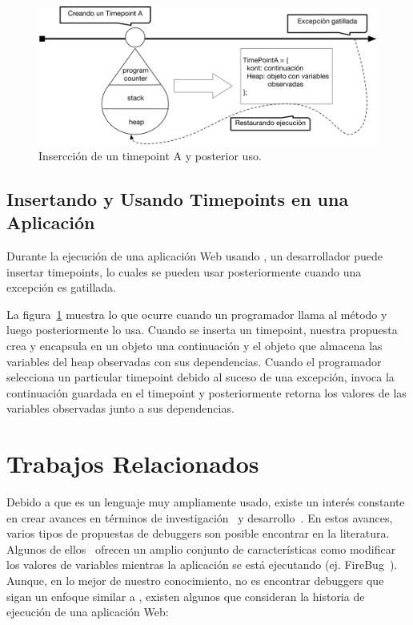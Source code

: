 \documentclass[conference]{IEEEtran}
\begin{document}
\begin{figure}[t]
\begin{center}
\includegraphics[width=.95\linewidth]{fig-timePointA}
\caption{Insercci\'on de un timepoint A y posterior uso.}
\label{fig:tpA}
\end{center}
\end{figure}


\subsection{Insertando y Usando Timepoints en una Aplicaci\'on}
\label{sec:utime}

Durante la ejecuci\'on de una aplicaci\'on Web usando \deloreanjs, un desarrollador puede insertar timepoints, lo cuales se pueden usar posteriormente cuando una excepci\'on es gatillada.  

 La figura~\ref{fig:tpA} muestra lo que ocurre cuando un programador llama al m\'etodo  y luego posteriormente lo usa. Cuando se inserta un timepoint, nuestra propuesta crea y encapsula en un objeto  una continuaci\'on y el objeto que almacena las variables del heap observadas con sus dependencias. Cuando el programador selecciona un particular timepoint debido al suceso de una excepci\'on, \deloreanjs invoca la continuaci\'on guardada en el timepoint y posteriormente retorna los valores de las variables observadas junto a sus dependencias.   
 
\section{Trabajos Relacionados}
\label{sec:rw}

Debido a que \javascript es un lenguaje muy ampliamente usado, existe un inter\'es constante en crear avances en t\'erminos de investigaci\'on~\cite{vazquesAl:ist2018,legerAl:scp2013,legerAl:scp2015,zhengAl:www2011,chargueraudAl:www2018} y desarrollo~\cite{resig:jquery,angular,mckenzie:babel,rxjs}. En estos avances, varios tipos de propuestas de debuggers son posible encontrar en la literatura. Algunos de ellos~\cite{bartonOdvarko:www2011,jsbin,nodejsInspector} ofrecen un amplio conjunto de caracter\'isticas como modificar los valores de variables mientras la aplicaci\'on se est\'a ejecutando (ej. FireBug~\cite{bartonOdvarko:www2011}). Aunque, en lo mejor de nuestro conocimiento, no es encontrar debuggers que sigan un enfoque similar a \deloreanjs, existen algunos que consideran la historia de ejecuci\'on de una aplicaci\'on Web:       
\end{document}
